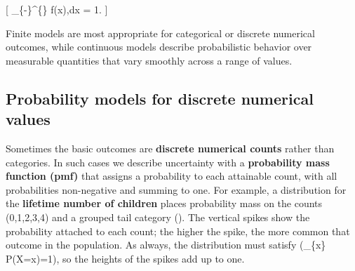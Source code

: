 \documentclass[
  letterpaper,
  DIV=11,
  numbers=noendperiod]{scrreprt}
\begin{document}
{[} \int\_\{-\infty\}\^{}\{\infty\} f(x),dx = 1. {]}

Finite models are most appropriate for categorical or discrete numerical
outcomes, while continuous models describe probabilistic behavior over
measurable quantities that vary smoothly across a range of values.

\subsection{Probability models for discrete numerical
values}\label{probability-models-for-discrete-numerical-values}

Sometimes the basic outcomes are \textbf{discrete numerical counts}
rather than categories. In such cases we describe uncertainty with a
\textbf{probability mass function (pmf)} that assigns a probability to
each attainable count, with all probabilities non-negative and summing
to one. For example, a distribution for the \textbf{lifetime number of
children} places probability mass on the counts (0,1,2,3,4) and a
grouped tail category (). The vertical spikes show the probability
attached to each count; the higher the spike, the more common that
outcome in the population. As always, the distribution must satisfy
(\sum\_\{x\} P(X=x)=1), so the heights of the spikes add up to one.
\end{document}

